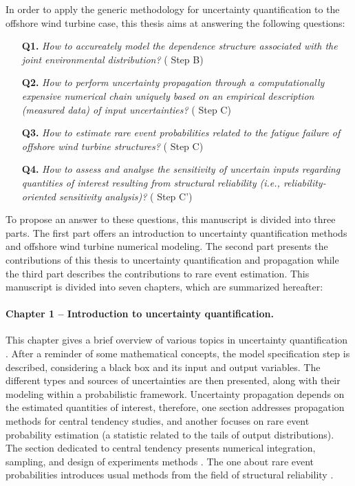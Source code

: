 In order to apply the generic methodology for uncertainty quantification to the offshore wind turbine case, this thesis aims at answering the following questions: 
\begin{itemize}
    \item[\textbf{Q1.}] \textit{
    How to accureately model the dependence structure associated with the joint environmental distribution? 
    } ( Step B)
    \item[\textbf{Q2.}] \textit{
    How to perform uncertainty propagation through a computationally expensive numerical chain uniquely based on an empirical description (measured data) of input uncertainties?
    } ( Step C)
    \item[\textbf{Q3.}] \textit{
    How to estimate rare event probabilities related to the fatigue failure of offshore wind turbine structures?
    } ( Step C)
    \item[\textbf{Q4.}] \textit{
    How to assess and analyse the sensitivity of uncertain inputs regarding quantities of interest resulting from structural reliability (i.e., reliability-oriented sensitivity analysis)? 
    } ( Step C')
\end{itemize}

To propose an answer to these questions, this manuscript is divided into three parts. 
The first part offers an introduction to uncertainty quantification methods and offshore wind turbine numerical modeling. 
The second part presents the contributions of this thesis to uncertainty quantification and propagation while the third part describes the contributions to rare event estimation. 
This manuscript is divided into seven chapters, which are summarized hereafter: 

\paragraph{Chapter 1 -- Introduction to uncertainty quantification.} 
This chapter gives a brief overview of various topics in uncertainty quantification \citep{sullivan_2015}. 
After a reminder of some mathematical concepts, the model specification step is described, considering a black box and its input and output variables. 
The different types and sources of uncertainties are then presented, along with their modeling within a probabilistic framework. 
Uncertainty propagation depends on the estimated quantities of interest, therefore, one section addresses propagation methods for central tendency studies, 
and another focuses on rare event probability estimation (a statistic related to the tails of output distributions). 
The section dedicated to central tendency presents numerical integration, sampling, and design of experiments methods \citep{fang_liu_2018}. 
The one about rare event probabilities introduces usual methods from the field of structural reliability \citep{lemaire_2013,MorioBalesdent2015}. 

